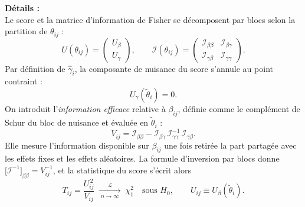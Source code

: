 \documentclass[11pt,a4paper]{article}
\begin{document}
\textbf{Détails :}
\\
Le score et la matrice d'information de Fisher se décomposent par blocs selon la partition de $\theta_{ij}$ :
\[
  U(\theta_{ij}) =
  \begin{pmatrix} U_{\beta} \\[2pt] U_{\gamma} \end{pmatrix},
  \qquad
  \mathcal{I}(\theta_{ij}) =
  \begin{pmatrix}
    \mathcal{I}_{\beta\beta} & \mathcal{I}_{\beta\gamma} \\[2pt]
    \mathcal{I}_{\gamma\beta} & \mathcal{I}_{\gamma\gamma}
  \end{pmatrix}.
\]
Par définition de $\hat{\gamma}_i$, la composante de nuisance du score s'annule
au point contraint :
\begin{equation}
  U_{\gamma}(\tilde{\theta}_i) = 0 .
  \label{eq:score-nul}
\end{equation}
On introduit l'\emph{information efficace} relative à $\beta_{ij}$, définie
comme le complément de Schur du bloc de nuisance et évaluée en
$\tilde{\theta}_i$ :
\begin{equation}
  V_{ij}
  = \mathcal{I}_{\beta\beta}
    - \mathcal{I}_{\beta\gamma}\,\mathcal{I}_{\gamma\gamma}^{-1}\,\mathcal{I}_{\gamma\beta}.
  \label{eq:info-efficace}
\end{equation}
Elle mesure l'information disponible sur $\beta_{ij}$ une fois retirée la part
partagée avec les effets fixes et les effets aléatoires. La formule
d'inversion par blocs donne
$\bigl[\mathcal{I}^{-1}\bigr]_{\beta\beta} = V_{ij}^{-1}$, et la statistique du
score s'écrit alors
\begin{equation}
  T_{ij} = \frac{U_{ij}^{\,2}}{V_{ij}}
  \;\xrightarrow[\;n \to \infty\;]{\mathcal{L}}\; \chi^2_1
  \quad \text{sous } H_0,
  \qquad
  U_{ij} \equiv U_{\beta}(\tilde{\theta}_i).
  \label{eq:rao}
\end{equation}
\\
\vspace{0.5cm}
\end{document}
